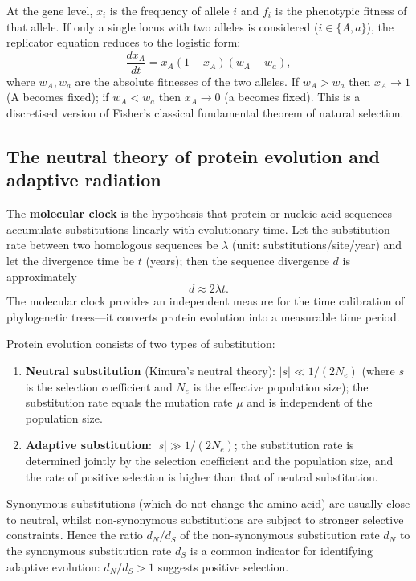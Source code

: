 \begin{corollary}\label{cor:gene_replicator}
At the gene level, $x_i$ is the frequency of allele $i$ and $f_i$ is the phenotypic fitness of that allele. If only a single locus with two alleles is considered ($i \in \{A, a\}$), the replicator equation reduces to the logistic form:
\[
\frac{dx_A}{dt} = x_A(1-x_A)(w_A - w_a),
\]
where $w_A, w_a$ are the absolute fitnesses of the two alleles. If $w_A > w_a$ then $x_A \to 1$ (A becomes fixed); if $w_A < w_a$ then $x_A \to 0$ (a becomes fixed). This is a discretised version of Fisher's classical fundamental theorem of natural selection.
\end{corollary}

\subsection{The neutral theory of protein evolution and adaptive radiation}

\begin{definition}\label{def:molecular_clock}
The \textbf{molecular clock} is the hypothesis that protein or nucleic-acid sequences accumulate substitutions linearly with evolutionary time. Let the substitution rate between two homologous sequences be $\lambda$ (unit: substitutions/site/year) and let the divergence time be $t$ (years); then the sequence divergence $d$ is approximately
\[
d \approx 2\lambda t.
\]
The molecular clock provides an independent measure for the time calibration of phylogenetic trees---it converts protein evolution into a measurable time period.
\end{definition}

\begin{proposition}\label{prop:neutral_selection}
Protein evolution consists of two types of substitution:
\begin{enumerate}[label=(\roman*)]
    \item \textbf{Neutral substitution} (Kimura's neutral theory): $|s| \ll 1/(2N_e)$ (where $s$ is the selection coefficient and $N_e$ is the effective population size); the substitution rate equals the mutation rate $\mu$ and is independent of the population size.
    \item \textbf{Adaptive substitution}: $|s| \gg 1/(2N_e)$; the substitution rate is determined jointly by the selection coefficient and the population size, and the rate of positive selection is higher than that of neutral substitution.
\end{enumerate}
Synonymous substitutions (which do not change the amino acid) are usually close to neutral, whilst non-synonymous substitutions are subject to stronger selective constraints. Hence the ratio $d_N/d_S$ of the non-synonymous substitution rate $d_N$ to the synonymous substitution rate $d_S$ is a common indicator for identifying adaptive evolution: $d_N/d_S > 1$ suggests positive selection.
\end{proposition}

